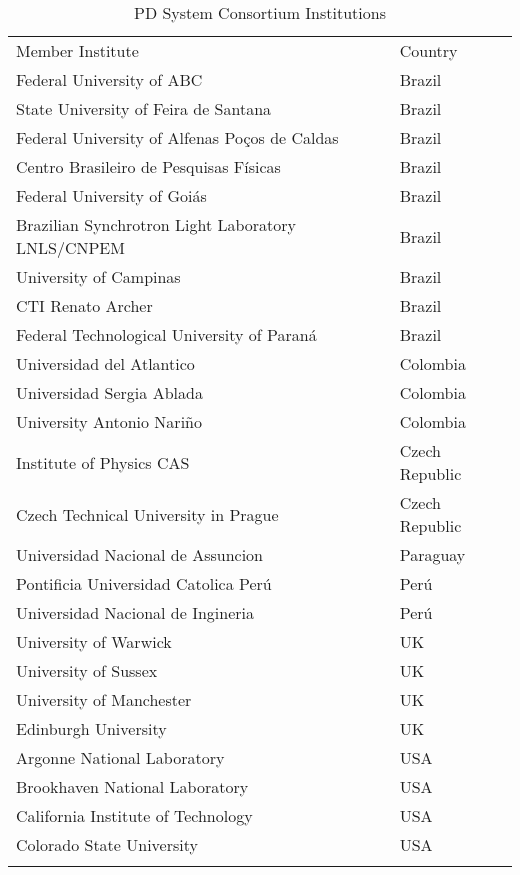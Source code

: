 \begin{longtable}
{ll}
\caption{PD System Consortium Institutions}\\ \colhline
\rowcolor{dunetablecolor} Member Institute  &  Country       \\  \toprowrule
Federal University of ABC & Brazil \\ \colhline
State University of Feira de Santana & Brazil \\ \colhline
Federal University of Alfenas Po\c{c}os de Caldas & Brazil \\ \colhline
Centro Brasileiro de Pesquisas F\'isicas & Brazil \\ \colhline
Federal University of Goi\'as & Brazil \\ \colhline
Brazilian Synchrotron Light Laboratory LNLS/CNPEM & Brazil \\ \colhline
University of Campinas & Brazil \\ \colhline
CTI Renato Archer & Brazil \\ \colhline
Federal Technological University of Paran\'a & Brazil \\ \colhline
Universidad del Atlantico & Colombia \\ \colhline
Universidad Sergia Ablada & Colombia \\ \colhline
University Antonio Nari\~{n}o & Colombia \\ \colhline
Institute of Physics CAS & Czech Republic \\ \colhline
Czech Technical University in Prague & Czech Republic \\ \colhline
Universidad Nacional de Assuncion & Paraguay \\ \colhline
Pontificia Universidad Catolica Per\'{u} & Per\'{u} \\ \colhline
Universidad Nacional de Ingineria & Per\'{u} \\ \colhline
University of Warwick & UK \\ \colhline
University of Sussex & UK \\ \colhline
University of Manchester & UK \\ \colhline
Edinburgh University & UK \\ \colhline
Argonne National Laboratory & USA \\\colhline
Brookhaven National Laboratory & USA \\ \colhline
California Institute of Technology & USA \\ \colhline
Colorado State University   &  USA  \\ \colhline

\end{longtable}
